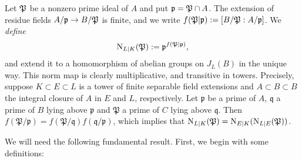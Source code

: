 Let $\mathfrak{P}$ be a nonzero prime ideal of $A$ and put $\mathfrak{p} = \mathfrak{P} \cap A$.
The extension of residue fields $A/\mathfrak{p} \to B/\mathfrak{P}$ is finite, and we write $f(\mathfrak{P}|\mathfrak{p}) := [B/\mathfrak{P} : A/\mathfrak{p}]$.
We \emph{define}
\[ \operatorname{N}_{L|K}(\mathfrak{P}) := \mathfrak{p}^{f(\mathfrak{P}|\mathfrak{p})}, \]
and extend it to a homomorphism of abelian groups on $J_{L}(B)$ in the unique way.
This norm map is clearly multiplicative, and transitive in towers.
Precisely, suppose $K \subset E \subset L$ is a tower of finite separable field extensions and $A \subset B \subset B$ the integral closure of $A$ in $E$ and $L$, respectively.
Let $\mathfrak p$ be a prime of $A$, $\mathfrak q$ a prime of $B$ lying above $\mathfrak p$ and $\mathfrak P$ a prime of $C$ lying above $\mathfrak q$.
Then $f(\mathfrak{P} / \mathfrak{p})=f(\mathfrak{P} / \mathfrak{q}) f(\mathfrak{q} / \mathfrak{p})$, which implies that $\operatorname{N}_{L|K}(\mathfrak P) = \operatorname{N}_{E|K}(\operatorname{N}_{L|E}(\mathfrak P))$.

We will need the following fundamental result. First, we begin with some definitions:

